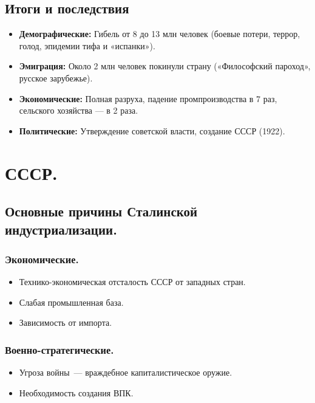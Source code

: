 \documentclass[12pt]{article}
\begin{document}
	\subsection{Итоги и последствия}
	\begin{itemize}
		\item \textbf{Демографические:} Гибель от 8 до 13 млн человек (боевые потери, террор, голод, эпидемии тифа и «испанки»).
		\item \textbf{Эмиграция:} Около 2 млн человек покинули страну («Философский пароход», русское зарубежье).
		\item \textbf{Экономические:} Полная разруха, падение промпроизводства в 7 раз, сельского хозяйства --- в 2 раза.
		\item \textbf{Политические:} Утверждение советской власти, создание СССР (1922).
	\end{itemize}
	
	\section{СССР.}
	
	\subsection{Основные причины Сталинской индустриализации.}
	
	\subsubsection{Экономические.}
	
	\begin{itemize}
		\item Технико-экономическая отсталость СССР от западных стран.
		\item Слабая промышленная база.
		\item Зависимость от импорта.
	\end{itemize}
	
	\subsubsection{Военно-стратегические.}
	
	\begin{itemize}
		\item Угроза войны~--- враждебное капиталистическое оружие.
		\item Необходимость создания ВПК.
	\end{itemize}
	
\end{document}
